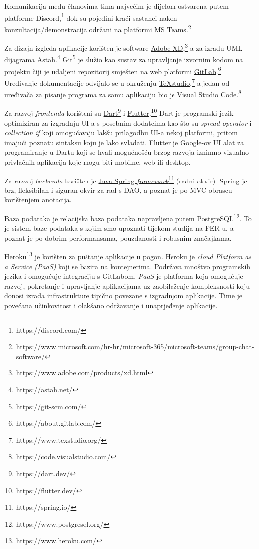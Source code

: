 			 \normalsize{Komunikacija među članovima tima najvećim je dijelom ostvarena putem platforme  \underline{Discord},\footnote{https://discord.com/} dok su pojedini kraći sastanci nakon konzultacija/demonstracija održani na platformi \underline{MS Teams}.\footnote{https://www.microsoft.com/hr-hr/microsoft-365/microsoft-teams/group-chat-software/}
			 	
			 Za dizajn izgleda aplikacije korišten je software \underline{Adobe XD},\footnote{https://www.adobe.com/products/xd.html}
			 a za izradu UML dijagrama \underline{Astah}.\footnote{https://astah.net/}
			 \underline{Git}\footnote{https://git-scm.com/} je služio kao sustav za upravljanje izvornim kodom na projektu čiji je udaljeni repozitorij smješten na web platformi \underline{GitLab}.\footnote{https://about.gitlab.com/}
			 \newline Uređivanje dokumentacije odvijalo se u okruženju \underline{TeXstudio},\footnote{https://www.texstudio.org/} a jedan od uređivača za pisanje programa za samu aplikaciju bio je \underline{Visual Studio Code}.\footnote{https://code.visualstudio.com/}
			 
			 Za razvoj \textit{frontenda} korišteni su \underline{Dart}\footnote{https://dart.dev/} i \underline{Flutter}.\footnote{https://flutter.dev/} 
			 Dart je programski jezik optimiziran za izgradnju UI-a s posebnim dodatcima kao što su \textit{spread operator} i \textit{collection if} koji omogućavaju lakšu prilagodbu UI-a nekoj platformi, pritom imajući poznatu sintaksu koju je lako svladati. Flutter je Google-ov UI alat za programiranje u Dartu koji se hvali mogućnošću brzog razvoja iznimno vizualno privlačnih aplikacija koje mogu biti mobilne, web ili desktop.
			 
			 Za razvoj \textit{backenda} korišten je \underline{Java Spring \textit{framework}}\footnote{https://spring.io/} (radni okvir). Spring je brz, fleksibilan i siguran okvir za rad s DAO, a poznat je po MVC obrascu korištenjem anotacija.
			 
			 Baza podataka je relacijska baza podataka napravljena putem \underline{PostgreSQL}\footnote{https://www.postgresql.org/}. To je sistem baze podataka s kojim smo upoznati tijekom studija na FER-u, a poznat je po dobrim performansama, pouzdanosti i robusnim značajkama.
			 
			 \underline{Heroku}\footnote{https://www.heroku.com/} je korišten za puštanje aplikacije u pogon. Heroku je \textit{cloud Platform as a Service (PaaS)} koji se bazira na kontejnerima. Podržava mnoštvo programskih jezika i omogućuje integraciju s GitLabom. \textit{PaaS} je platforma koja omogućuje razvoj, pokretanje i upravljanje aplikacijama uz zaobilaženje kompleksnosti koju donosi izrada infrastrukture tipično povezane s izgradnjom aplikacije. Time je povećana učinkovitost i olakšano održavanje i unaprjeđenje aplikacije.
		 }
			
